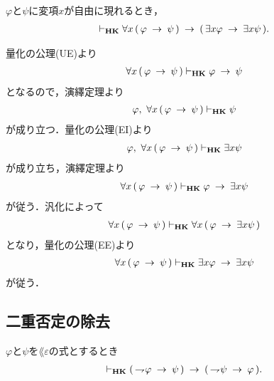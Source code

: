 	\begin{screen}
		\begin{thm}
		\label{classic:no_description_1}
			$\varphi$と$\psi$に変項$x$が自由に現れるとき，
			\begin{align}
				\vdash_{{\scriptsize \mbox{{\bf HK}}}} \forall x\, (\, \varphi \hspace{0.25em}\rightarrow\hspace{0.25em} \psi\, )
				\hspace{0.25em}\rightarrow\hspace{0.25em} (\, \exists x \varphi \hspace{0.25em}\rightarrow\hspace{0.25em} \exists x \psi\, ).
			\end{align}
		\end{thm}
	\end{screen}
	
	\begin{sketch}
		量化の公理(UE)より
		\begin{align}
			\forall x\, (\, \varphi \hspace{0.25em}\rightarrow\hspace{0.25em} \psi\, ) \vdash_{{\scriptsize \mbox{{\bf HK}}}}
			\varphi \hspace{0.25em}\rightarrow\hspace{0.25em} \psi
		\end{align}
		となるので，演繹定理より
		\begin{align}
			\varphi,\ \forall x\, (\, \varphi \hspace{0.25em}\rightarrow\hspace{0.25em} \psi\, ) 
			\vdash_{{\scriptsize \mbox{{\bf HK}}}} \psi
		\end{align}
		が成り立つ．量化の公理(EI)より
		\begin{align}
			\varphi,\ \forall x\, (\, \varphi \hspace{0.25em}\rightarrow\hspace{0.25em} \psi\, ) 
			\vdash_{{\scriptsize \mbox{{\bf HK}}}} \exists x \psi
		\end{align}
		が成り立ち，演繹定理より
		\begin{align}
			\forall x\, (\, \varphi \hspace{0.25em}\rightarrow\hspace{0.25em} \psi\, ) 
			\vdash_{{\scriptsize \mbox{{\bf HK}}}} \varphi \hspace{0.25em}\rightarrow\hspace{0.25em} \exists x \psi
		\end{align}
		が従う．汎化によって
		\begin{align}
			\forall x\, (\, \varphi \hspace{0.25em}\rightarrow\hspace{0.25em} \psi\, ) \vdash_{{\scriptsize \mbox{{\bf HK}}}} 
			\forall x\, (\, \varphi \hspace{0.25em}\rightarrow\hspace{0.25em} \exists x \psi\, )
		\end{align}
		となり，量化の公理(EE)より
		\begin{align}
			\forall x\, (\, \varphi \hspace{0.25em}\rightarrow\hspace{0.25em} \psi\, ) \vdash_{{\scriptsize \mbox{{\bf HK}}}} 
			\exists x \varphi \hspace{0.25em}\rightarrow\hspace{0.25em} \exists x \psi
		\end{align}
		が従う．
		\QED
	\end{sketch}

\subsection{二重否定の除去}
	\begin{screen}
		\begin{thm}[対偶律3]\label{classic:contraposition_3}
			$\varphi$と$\psi$を$\lang{\varepsilon}$の式とするとき
			\begin{align}
				\vdash_{{\scriptsize \mbox{{\bf HK}}}} (\, \rightharpoondown\hspace{-0.25em} \varphi \hspace{0.25em}\rightarrow\hspace{0.25em} \psi\, )
				\hspace{0.25em}\rightarrow\hspace{0.25em} (\, \rightharpoondown\hspace{-0.25em} \psi \hspace{0.25em}\rightarrow\hspace{0.25em} \varphi\, ).
			\end{align}
		\end{thm}
	\end{screen}
	
